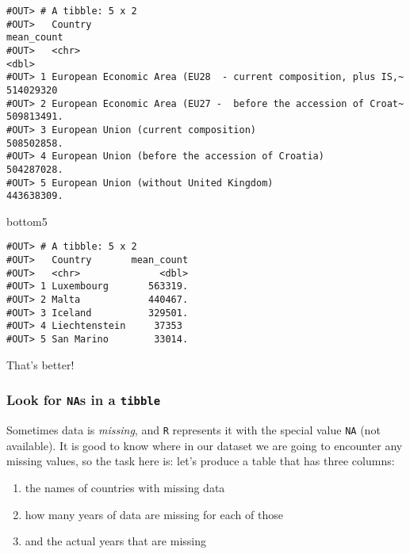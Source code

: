 \documentclass[]{book}
\newenvironment{Shaded}{\begin{snugshade}}{\end{snugshade}}
\newcommand{\NormalTok}[1]{#1}
\providecommand{\tightlist}{%
  \setlength{\itemsep}{0pt}\setlength{\parskip}{0pt}}
\begin{document}
\begin{verbatim}
#OUT> # A tibble: 5 x 2
#OUT>   Country                                                        mean_count
#OUT>   <chr>                                                               <dbl>
#OUT> 1 European Economic Area (EU28  - current composition, plus IS,~ 514029320 
#OUT> 2 European Economic Area (EU27 -  before the accession of Croat~ 509813491.
#OUT> 3 European Union (current composition)                           508502858.
#OUT> 4 European Union (before the accession of Croatia)               504287028.
#OUT> 5 European Union (without United Kingdom)                        443638309.
\end{verbatim}

\begin{Shaded}
\begin{Highlighting}[]
\NormalTok{bottom5}
\end{Highlighting}
\end{Shaded}

\begin{verbatim}
#OUT> # A tibble: 5 x 2
#OUT>   Country       mean_count
#OUT>   <chr>              <dbl>
#OUT> 1 Luxembourg       563319.
#OUT> 2 Malta            440467.
#OUT> 3 Iceland          329501.
#OUT> 4 Liechtenstein     37353 
#OUT> 5 San Marino        33014.
\end{verbatim}

That's better!

\subsubsection*{\texorpdfstring{Look for \texttt{NA}s in a
\texttt{tibble}}{Look for NAs in a tibble}}\label{look-for-nas-in-a-tibble}

Sometimes data is \emph{missing}, and \texttt{R} represents it with the
special value \texttt{NA} (not available). It is good to know where in
our dataset we are going to encounter any missing values, so the task
here is: let's produce a table that has three columns:

\begin{enumerate}
\def\labelenumi{\arabic{enumi}.}
\tightlist
\item
  the names of countries with missing data
\item
  how many years of data are missing for each of those
\item
  and the actual years that are missing
\end{enumerate}
\end{document}
